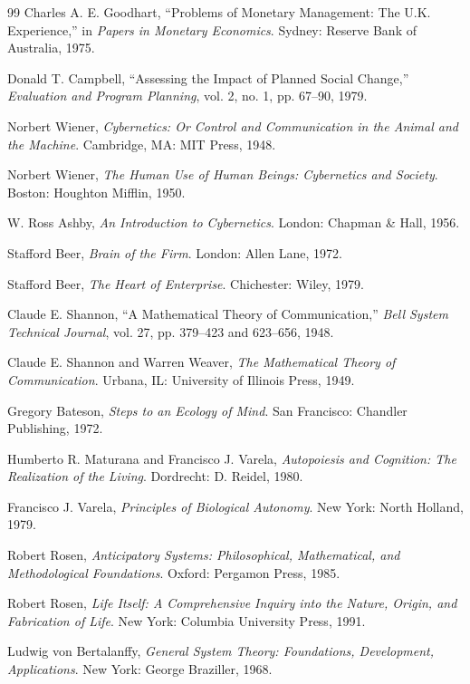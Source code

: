 \documentclass[11pt,oneside]{book}
\theoremstyle{definition}
\theoremstyle{remark}
\begin{document}
\begin{thebibliography}{99}
 Charles A. E. Goodhart, ``Problems of Monetary Management: The U.K. Experience,'' in
  \emph{Papers in Monetary Economics}. Sydney: Reserve Bank of Australia, 1975.

 Donald T. Campbell, ``Assessing the Impact of Planned Social Change,'' \emph{Evaluation and
  Program Planning}, vol. 2, no. 1, pp. 67--90, 1979.

 Norbert Wiener, \emph{Cybernetics: Or Control and Communication in the Animal and the Machine}.
  Cambridge, MA: MIT Press, 1948.

 Norbert Wiener, \emph{The Human Use of Human Beings: Cybernetics and Society}. Boston: Houghton
  Mifflin, 1950.

 W. Ross Ashby, \emph{An Introduction to Cybernetics}. London: Chapman \& Hall, 1956.

 Stafford Beer, \emph{Brain of the Firm}. London: Allen Lane, 1972.

 Stafford Beer, \emph{The Heart of Enterprise}. Chichester: Wiley, 1979.

 Claude E. Shannon, ``A Mathematical Theory of Communication,'' \emph{Bell System Technical
  Journal}, vol. 27, pp. 379--423 and 623--656, 1948.

 Claude E. Shannon and Warren Weaver, \emph{The Mathematical Theory of Communication}. Urbana,
  IL: University of Illinois Press, 1949.

 Gregory Bateson, \emph{Steps to an Ecology of Mind}. San Francisco: Chandler Publishing, 1972.

 Humberto R. Maturana and Francisco J. Varela, \emph{Autopoiesis and Cognition: The Realization
  of the Living}. Dordrecht: D. Reidel, 1980.

 Francisco J. Varela, \emph{Principles of Biological Autonomy}. New York: North Holland, 1979.

 Robert Rosen, \emph{Anticipatory Systems: Philosophical, Mathematical, and Methodological
  Foundations}. Oxford: Pergamon Press, 1985.

 Robert Rosen, \emph{Life Itself: A Comprehensive Inquiry into the Nature, Origin, and
  Fabrication of Life}. New York: Columbia University Press, 1991.

 Ludwig von Bertalanffy, \emph{General System Theory: Foundations, Development, Applications}.
  New York: George Braziller, 1968.


\end{thebibliography}
\end{document}
